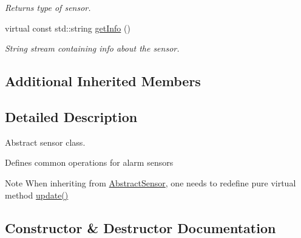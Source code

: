 \begin{DoxyCompactItemize}
\begin{DoxyCompactList}\small\item\em Returns type of sensor. \end{DoxyCompactList}\item 
virtual const std\+::string \hyperlink{classAbstractSensor_a8ffd3cb0ec2f1740466cab60db318d4a}{get\+Info} ()\hypertarget{classAbstractSensor_a8ffd3cb0ec2f1740466cab60db318d4a}{}\label{classAbstractSensor_a8ffd3cb0ec2f1740466cab60db318d4a}

\begin{DoxyCompactList}\small\item\em String stream containing info about the sensor. \end{DoxyCompactList}\end{DoxyCompactItemize}
\subsection*{Additional Inherited Members}


\subsection{Detailed Description}
Abstract sensor class. 

Defines common operations for alarm sensors

\begin{DoxyNote}{Note}
When inheriting from \hyperlink{classAbstractSensor}{Abstract\+Sensor}, one needs to redefine pure virtual method \hyperlink{classAbstractSensor_a8d0a1908c6aaf67fc7d781e54b49293b}{update()} 
\end{DoxyNote}


\subsection{Constructor \& Destructor Documentation}

